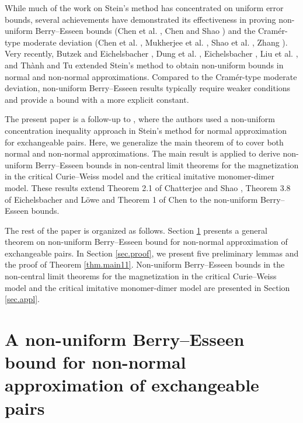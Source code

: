 	While much of the work on Stein's method has concentrated on uniform error bounds, 
	several achievements have demonstrated its effectiveness in proving non-uniform Berry--Esseen bounds (Chen et al. \cite{chen2021error}, Chen and Shao \cite{chen2001non,chen2004normal})
	and the Cram\'{e}r-type moderate deviation (Chen et al. \cite{chen2013stein}, Mukherjee et al. \cite{mukherjee2024moderate}, Shao et al. \cite{shao2021cramer}, Zhang \cite{zhang2023cramer}). 
	Very recently, Butzek and Eichelsbacher \cite{butzek2024non}, Dung et al. \cite{dung2025non}, Eichelsbacher \cite{eichelsbacher2024stein}, Liu et al. \cite{liu2021non}, and Th\`{a}nh and Tu \cite{thanh2025non} extended Stein's method to obtain non-uniform bounds in
	normal and non-normal approximations.
Compared to the Cram\'{e}r-type moderate deviation, 
non-uniform Berry--Esseen results typically require weaker conditions and provide a bound with a more explicit constant.
	
	The present paper is a follow-up to \cite{thanh2025non},
	where the authors used a non-uniform concentration inequality approach in Stein's method for normal approximation
	for exchangeable pairs. Here, we generalize the main theorem of \cite{thanh2025non} to cover both normal and non-normal approximations.
	The main result is applied to derive non-uniform Berry--Esseen bounds in non-central limit theorems for the magnetization in the
	critical Curie--Weiss model
and the critical imitative monomer-dimer model. These results extend Theorem 2.1 of Chatterjee and Shao \cite{chatterjee2011nonnormal}, 
Theorem 3.8 of Eichelsbacher and L\"{o}we \cite{eichelsbacher2010stein} and Theorem 1 of Chen \cite{chen2016limit} to the non-uniform Berry--Esseen bounds.
	
	
	The rest of the paper is organized as follows.
	Section \ref{sec.main} presents a general theorem on non-uniform Berry--Esseen bound for non-normal approximation of exchangeable pairs.
	In Section \ref{sec.proof}, we present five preliminary lemmas and the proof of Theorem \ref{thm.main11}. 
	Non-uniform Berry--Esseen bounds 
	in the non-central limit theorems for the magnetization in the critical Curie--Weiss model and the
	critical imitative monomer-dimer model
	are presented in Section \ref{sec.appl}.
	
	
	\section{A non-uniform Berry--Esseen bound for non-normal approximation of exchangeable pairs}\label{sec.main}
	

